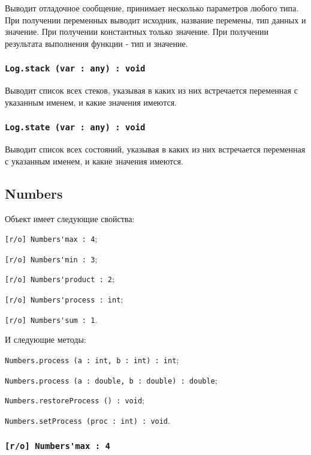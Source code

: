Выводит отладочное сообщение, принимает несколько параметров любого типа. При получении переменных выводит исходник, название перемены, тип данных и значение. При получении константных только значение. При получении результата выполнения функции - тип и значение. 

\subsubsection{\lstinline|Log.stack (var : any) : void|}

Выводит список всех стеков, указывая в каких из них встречается переменная с указанным именем, и какие значения имеются.

\subsubsection{\lstinline|Log.state (var : any) : void|}

Выводит список всех состояний, указывая в каких из них встречается переменная с указанным именем, и какие значения имеются.

\subsection{{\color{orange} Numbers}}

Объект \numbers{} имеет следующие свойства:
\begin{icItems}
	\item \lstinline|[r/o] Numbers'max : 4|;
	\item \lstinline|[r/o] Numbers'min : 3|;
	\item \lstinline|[r/o] Numbers'product : 2|;
	\item \lstinline|[r/o] Numbers'process : int|;
	\item \lstinline|[r/o] Numbers'sum : 1|.
\end{icItems}

И следующие методы:
\begin{icItems}
	\item \lstinline|Numbers.process (a : int, b : int) : int|;
	\item \lstinline|Numbers.process (a : double, b : double) : double|;
	\item \lstinline|Numbers.restoreProcess () : void|;
	\item \lstinline|Numbers.setProcess (proc : int) : void|.
\end{icItems}

\subsubsection{\lstinline|[r/o] Numbers'max : 4|}

